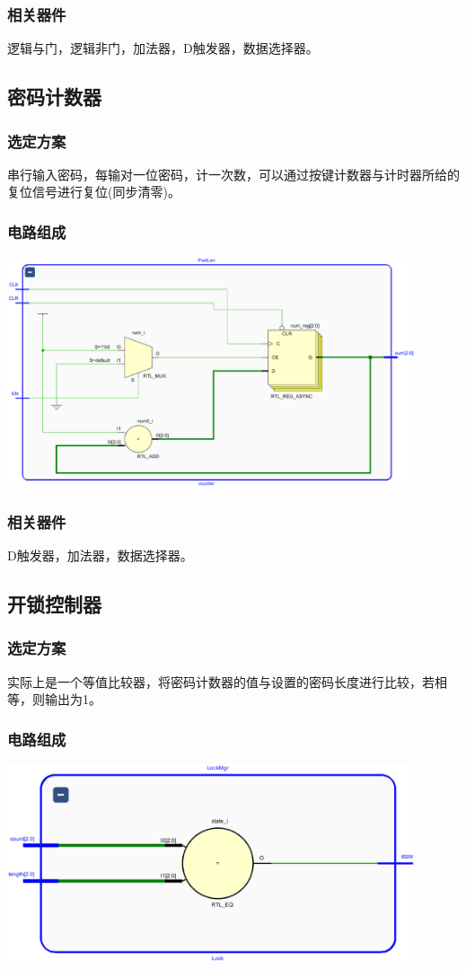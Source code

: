 \documentclass[a4paper,11pt]{ctexart}
\begin{document}
\subsubsection{相关器件}逻辑与门，逻辑非门，加法器，D触发器，数据选择器。

\subsection{密码计数器}
\subsubsection{选定方案}串行输入密码，每输对一位密码，计一次数，可以通过按键计数器与计时器所给的复位信号进行复位(同步清零)。
\subsubsection{电路组成}\includegraphics[width = 0.9\textwidth]{./images/PwdLenRTL.eps}
\subsubsection{相关器件}D触发器，加法器，数据选择器。

\subsection{开锁控制器}
\subsubsection{选定方案}实际上是一个等值比较器，将密码计数器的值与设置的密码长度进行比较，若相等，则输出为1。
\subsubsection{电路组成}\includegraphics[width =0.9\textwidth]{./images/LockMgrRTL.eps}
\end{document}
